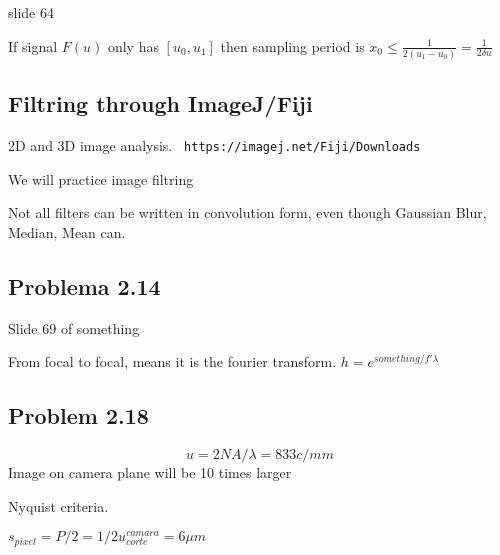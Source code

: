 \documentclass[../main/main.tex]{subfiles}
\begin{document}
slide 64

If signal $F(u)$ only has $[u_{0}, u_{1}]$  then sampling period is $x_{0}\leq \frac 1 {2 (u_{1}-u_{0})}= \frac 1 {2 \delta u}$


\subsection{Filtring through ImageJ/Fiji}

2D and 3D image analysis. \verb| https://imagej.net/Fiji/Downloads|

We will practice image filtring

Not all filters can be written in convolution form, even though Gaussian Blur, Median, Mean can.


\subsection{Problema 2.14}
Slide 69 of something

From focal to focal, means it is the fourier transform. $h = e^{something/f'\lambda}$

\subsection{Problem 2.18}

\begin{equation}
	u=2NA/\lambda = 833c/mm
\end{equation}
Image on camera plane will be 10 times larger

Nyquist criteria.

$s_{pixel} = P/2 = 1/2u^{camara}_{corte} = 6\mu m$
\end{document}
